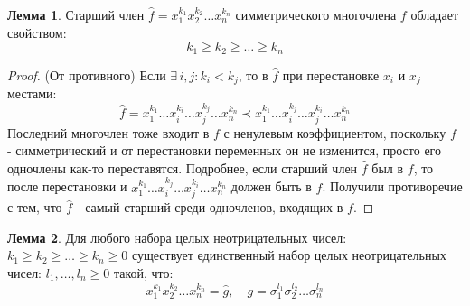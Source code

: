 \documentclass[12pt]{article}
\theoremstyle{definition}
\newtheorem{lemma}{Лемма}
\newcommand{\wht}[1]{\widehat{#1}}
\begin{document}
\begin{lemma}
	Старший член $\wht{f} = x_1^{k_1}x_2^{k_2}\dotsc x_n^{k_n}$ симметрического многочлена $f$ обладает свойством:
	$$
		k_1 \geq k_2 \geq \dots \geq k_n
	$$
\end{lemma}
\begin{proof}
	(От противного) Если $\exists\, i,j \colon k_i < k_j$, то в $\wht{f}$ при перестановке $x_i$ и $x_j$ местами:
	$$
		\wht{f} = x_1^{k_1}\dotsc x_i^{k_i}\dotsc x_j^{k_j}\dotsc x_n^{k_n} \prec x_1^{k_1}\dotsc x_i^{k_j}\dotsc x_j^{k_i}\dotsc x_n^{k_n}
	$$
	Последний многочлен тоже входит в $f$ с ненулевым коэффициентом, поскольку $f$ - симметрический и от перестановки переменных он не изменится, просто его одночлены как-то переставятся. Подробнее, если старший член $\wht{f}$ был в $f$, то после перестановки и $x_1^{k_1}\dotsc x_i^{k_j}\dotsc x_j^{k_i}\dotsc x_n^{k_n}$ должен быть в $f$. Получили противоречие с тем, что $\wht{f}$ - самый старший среди одночленов, входящих в $f$.
\end{proof}
\begin{lemma}
	Для любого набора целых неотрицательных чисел: $k_1 \geq k_2 \geq \dotsc \geq k_n \geq 0$ существует единственный набор целых неотрицательных чисел: $l_1,\dotsc, l_n \geq 0$ такой, что:
	$$
		x_1^{k_1}x_2^{k_2}\dotsc x_n^{k_n} = \wht{g}, \quad g = \sigma_1^{l_1}\sigma_2^{l_2}\dotsc \sigma_n^{l_n}
	$$
\end{lemma}
\end{document}

